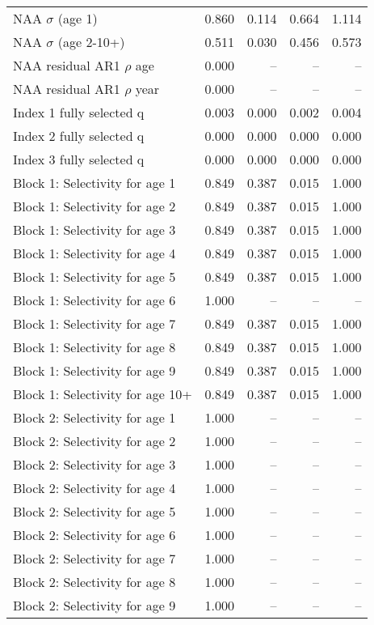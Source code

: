 \documentclass[
]{article}
\begin{document}
\begin{landscape}
\begin{longtable}[t]{lrrrr}
\endfoot
\bottomrule
\endlastfoot
NAA $\sigma$ (age 1) & 0.860 & 0.114 & 0.664 & 1.114\\
NAA $\sigma$ (age 2-10+) & 0.511 & 0.030 & 0.456 & 0.573\\
NAA residual AR1 $\rho$ age & 0.000 & -- & -- & --\\
NAA residual AR1 $\rho$ year & 0.000 & -- & -- & --\\
Index 1 fully selected q & 0.003 & 0.000 & 0.002 & 0.004\\
\addlinespace
Index 2 fully selected q & 0.000 & 0.000 & 0.000 & 0.000\\
Index 3 fully selected q & 0.000 & 0.000 & 0.000 & 0.000\\
Block 1: Selectivity for age 1 & 0.849 & 0.387 & 0.015 & 1.000\\
Block 1: Selectivity for age 2 & 0.849 & 0.387 & 0.015 & 1.000\\
Block 1: Selectivity for age 3 & 0.849 & 0.387 & 0.015 & 1.000\\
\addlinespace
Block 1: Selectivity for age 4 & 0.849 & 0.387 & 0.015 & 1.000\\
Block 1: Selectivity for age 5 & 0.849 & 0.387 & 0.015 & 1.000\\
Block 1: Selectivity for age 6 & 1.000 & -- & -- & --\\
Block 1: Selectivity for age 7 & 0.849 & 0.387 & 0.015 & 1.000\\
Block 1: Selectivity for age 8 & 0.849 & 0.387 & 0.015 & 1.000\\
\addlinespace
Block 1: Selectivity for age 9 & 0.849 & 0.387 & 0.015 & 1.000\\
Block 1: Selectivity for age 10+ & 0.849 & 0.387 & 0.015 & 1.000\\
Block 2: Selectivity for age 1 & 1.000 & -- & -- & --\\
Block 2: Selectivity for age 2 & 1.000 & -- & -- & --\\
Block 2: Selectivity for age 3 & 1.000 & -- & -- & --\\
\addlinespace
Block 2: Selectivity for age 4 & 1.000 & -- & -- & --\\
Block 2: Selectivity for age 5 & 1.000 & -- & -- & --\\
Block 2: Selectivity for age 6 & 1.000 & -- & -- & --\\
Block 2: Selectivity for age 7 & 1.000 & -- & -- & --\\
Block 2: Selectivity for age 8 & 1.000 & -- & -- & --\\
\addlinespace
Block 2: Selectivity for age 9 & 1.000 & -- & -- & --\\

\end{longtable}
\end{landscape}
\end{document}
